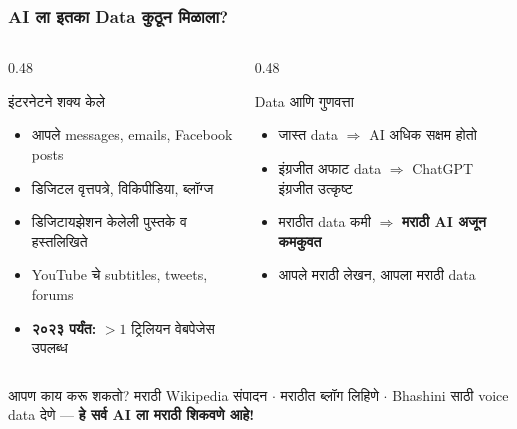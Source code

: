 \begin{frame}[fragile]\frametitle{AI ला इतका Data कुठून मिळाला?}

\begin{columns}[T]
\begin{column}{0.48\textwidth}
\begin{block}{इंटरनेटने शक्य केले}
\begin{itemize}
\item आपले messages, emails, Facebook posts
\item डिजिटल वृत्तपत्रे, विकिपीडिया, ब्लॉग्ज
\item डिजिटायझेशन केलेली पुस्तके व हस्तलिखिते
\item YouTube चे subtitles, tweets, forums
\item \textbf{२०२३ पर्यंत:} $> 1$ ट्रिलियन वेबपेजेस उपलब्ध
\end{itemize}
\end{block}
\end{column}
\begin{column}{0.48\textwidth}
\begin{block}{Data आणि गुणवत्ता}
\begin{itemize}
\item जास्त data $\Rightarrow$ AI अधिक सक्षम होतो
\item इंग्रजीत अफाट data $\Rightarrow$ ChatGPT इंग्रजीत उत्कृष्ट
\item मराठीत data कमी $\Rightarrow$ \textbf{मराठी AI अजून कमकुवत}
\item आपले मराठी लेखन, आपला मराठी data
\end{itemize}
\end{block}
\end{column}
\end{columns}

\vspace{0.2cm}
\begin{exampleblock}{आपण काय करू शकतो?}
मराठी Wikipedia संपादन $\cdot$ मराठीत ब्लॉग लिहिणे $\cdot$ Bhashini साठी voice data देणे
— \textbf{हे सर्व AI ला मराठी शिकवणे आहे!}
\end{exampleblock}


\end{frame}

